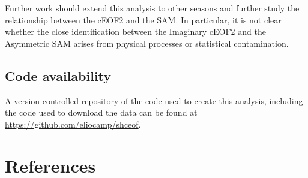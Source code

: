 \documentclass[smallextended]{svjour3}       %
\begin{document}
Further work should extend this analysis to other seasons and further study the relationship between the cEOF2 and the SAM.
In particular, it is not clear whether the close identification between the Imaginary cEOF2 and the Asymmetric SAM arises from physical processes or statistical contamination.

\hypertarget{code-availability}{%
\subsection*{Code availability}\label{code-availability}}

A version-controlled repository of the code used to create this analysis, including the code used to download the data can be found at \url{https://github.com/eliocamp/shceof}.

\hypertarget{references}{%
\section{References}\label{references}}




\end{document}

